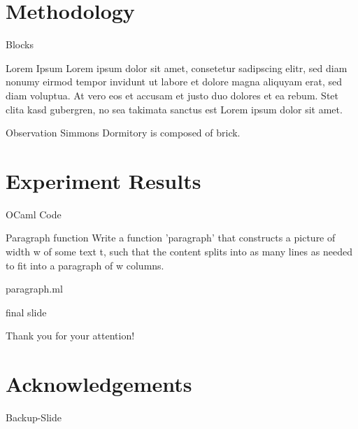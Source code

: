 \documentclass[cjk]{beamer}
\begin{document}
\section{Methodology}
\begin{frame}{Blocks}
  \begin{block}{Lorem Ipsum}
    Lorem ipsum dolor sit amet, consetetur sadipscing elitr, sed diam nonumy eirmod tempor invidunt ut labore et dolore magna aliquyam erat, sed diam voluptua.
    At vero eos et accusam et justo duo dolores et ea rebum. Stet clita kasd gubergren, no sea takimata sanctus est Lorem ipsum dolor sit amet.
  \end{block}
  \begin{block}{Observation}
    Simmons Dormitory is composed of brick.
  \end{block}
\end{frame}


\section{Experiment Results}
\begin{frame}{OCaml Code}
  \begin{center}
    \begin{block}{Paragraph function}
      Write a function 'paragraph' that constructs a picture of width w of some text t, such that the content splits into as many lines as needed to fit into a paragraph of w columns.
    \end{block}
    \begin{block}{paragraph.ml}
      {\small    }
    \end{block}
  \end{center}
\end{frame}


\begin{frame}
  \begin{beamercolorbox}[wd=\paperwidth, ht=1.4cm,rounded=true,shadow=true]{final slide}
    \begin{center}
      {\huge Thank you for your attention!}
    \end{center}
  \end{beamercolorbox}
\end{frame}

\section{Acknowledgements}
\begin{frame}[noframenumbering]{Backup-Slide}
\end{frame}
\end{document}
